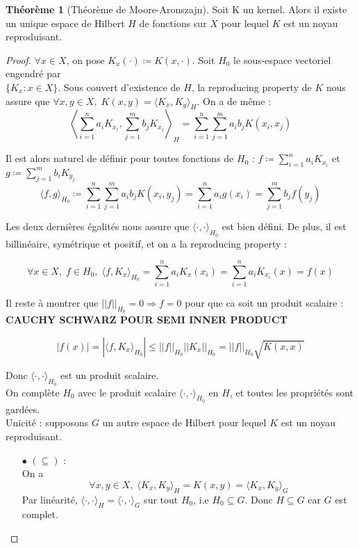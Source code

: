 \documentclass[a4paper, 11pt, french]{article}
\theoremstyle{definition}
\newtheorem{theorem}{Théorème}
\begin{document}
	\begin{theorem}[Théorème de Moore-Aronszajn]
	\label{th:mooaron}
	 	Soit K un kernel. Alors il existe un unique espace de Hilbert $H$ de fonctions sur $X$ pour lequel $K$ est un noyau reproduisant.
	\end{theorem}
	\begin{proof}
		$\forall x \in X$, on pose $K_x(\cdot) \coloneqq K(x, \cdot)$. Soit $H_0$ le sous-espace vectoriel engendré par \\ $\{K_x : x \in X\}$. Sous couvert d'existence de $H$, la reproducing property de $K$ nous assure que $\forall x, y \in X, \; K(x, y) = \langle K_x, K_y \rangle_H$. On a de même :
		\[\left\langle \sum_{i=1}^{n} a_i K_{x_i}, \sum_{j=1}^{m} b_j K_{x_j} \right\rangle_H = \sum_{i=1}^{n} \sum_{j=1}^{m} a_i b_j K(x_i, x_j)\]
		
		Il est alors naturel de définir pour toutes fonctions de $H_0$ : $f \coloneqq \sum_{i=1}^n a_i K_{x_i}$ et $g \coloneqq \sum_{j=1}^m b_i K_{y_j}$ 
		\[\langle f, g \rangle_{H_0} \coloneqq \sum_{i=1}^{n} \sum_{j=1}^{m} a_i b_j K(x_i, y_j) = \sum_{i=1}^n a_i g(x_i) = \sum_{j=1}^m b_j f(y_j)\]
		
		Les deux dernières égalités nous assure que $\langle \cdot, \cdot \rangle_{H_0}$ est bien défini. De plus, il est billinéaire, symétrique et positif, et on a la reproducing property :
		
		\[\forall x \in X, \; f \in H_0, \; \langle f, K_x \rangle_{H_0} = \sum_{i=1}^n a_i K_x(x_i) = \sum_{i=1}^n a_i K_{x_i}(x) = f(x)\]
		
		Il reste à montrer que $||f||_{H_0} = 0 \Rightarrow f = 0$ pour que ca soit un produit scalaire : {\bf CAUCHY SCHWARZ POUR SEMI INNER PRODUCT}
		
		\[|f(x)| = |\langle f, K_x \rangle_{H_0}| \leq ||f||_{H_0} ||K_x||_{H_0} = ||f||_{H_0} \sqrt{K(x,x)} \]
		
		Donc $\langle \cdot, \cdot \rangle_{H_0}$ est un produit scalaire. \\
		
		On complète $H_0$ avec le produit scalaire $\langle \cdot, \cdot \rangle_{H_0}$ en $H$, et toutes les propriétés sont gardées. \\
		
		Unicité : supposons $G$ un autre espace de Hilbert pour lequel $K$ est un noyau reproduisant. 
		\begin{itemize}
			\item[$\bullet$]
			$(\subseteq)$ : \\
			On a
			\[\forall x, y \in X, \; \langle K_x, K_y \rangle_H = K(x, y) = \langle K_x, K_y \rangle_G\]
			Par linéarité, $\langle \cdot, \cdot \rangle_H = \langle \cdot, \cdot \rangle_G$ sur tout $H_0$, i.e $H_0 \subseteq G$. Donc $H \subseteq G$ car $G$ est complet.
			

\end{itemize}
\end{proof}
\end{document}
